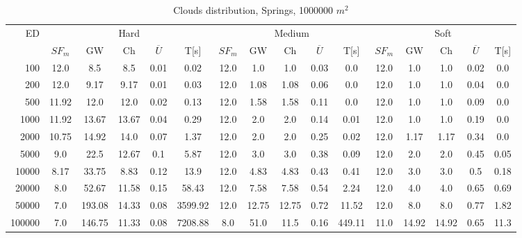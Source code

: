 \begin{table}[htb]
	\centering
	\footnotesize
	\begin{tabular}{|r|c|c|c|c|c|c|c|c|c|c|c|c|c|c|c|} 
		\hline
		\multirow{2}{*}{ED} & \multicolumn{5}{c|}{Hard} & \multicolumn{5}{c|}{Medium} &\multicolumn{5}{c|}{Soft} \\ 
		\cline{2-16} 
		&$SF_{m}$&GW & Ch & $\overline{U}$&T[s] &$SF_{m}$&GW & Ch & $\overline{U}$ &T[s] &$SF_{m}$&GW & Ch & $\overline{U}$  & T[s]  \\ 
		\hline 
		100 & 12.0 & 8.5 & 8.5 & 0.01 & 0.02 & 12.0 & 1.0 & 1.0 & 0.03 & 0.0 & 12.0 & 1.0 & 1.0 & 0.02 & 0.0\\ 
		200 & 12.0 & 9.17 & 9.17 & 0.01 & 0.03 & 12.0 & 1.08 & 1.08 & 0.06 & 0.0 & 12.0 & 1.0 & 1.0 & 0.04 & 0.0\\ 
		500 & 11.92 & 12.0 & 12.0 & 0.02 & 0.13 & 12.0 & 1.58 & 1.58 & 0.11 & 0.0 & 12.0 & 1.0 & 1.0 & 0.09 & 0.0\\ 
		1000 & 11.92 & 13.67 & 13.67 & 0.04 & 0.29 & 12.0 & 2.0 & 2.0 & 0.14 & 0.01 & 12.0 & 1.0 & 1.0 & 0.19 & 0.0\\ 
		2000 & 10.75 & 14.92 & 14.0 & 0.07 & 1.37 & 12.0 & 2.0 & 2.0 & 0.25 & 0.02 & 12.0 & 1.17 & 1.17 & 0.34 & 0.0\\ 
		5000 & 9.0 & 22.5 & 12.67 & 0.1 & 5.87 & 12.0 & 3.0 & 3.0 & 0.38 & 0.09 & 12.0 & 2.0 & 2.0 & 0.45 & 0.05\\ 
		10000 & 8.17 & 33.75 & 8.83 & 0.12 & 13.9 & 12.0 & 4.83 & 4.83 & 0.43 & 0.41 & 12.0 & 3.0 & 3.0 & 0.5 & 0.18\\ 
		20000 & 8.0 & 52.67 & 11.58 & 0.15 & 58.43 & 12.0 & 7.58 & 7.58 & 0.54 & 2.24 & 12.0 & 4.0 & 4.0 & 0.65 & 0.69\\ 
		50000 & 7.0 & 193.08 & 14.33 & 0.08 & 3599.92 & 12.0 & 12.75 & 12.75 & 0.72 & 11.52 & 12.0 & 8.0 & 8.0 & 0.77 & 1.82\\ 
		100000 & 7.0 & 146.75 & 11.33 & 0.08 & 7208.88 & 8.0 & 51.0 & 11.5 & 0.16 & 449.11 & 11.0 & 14.92 & 14.92 & 0.65 & 11.3\\ 
		\hline 
	\end{tabular} 
	\caption{Clouds distribution, Springs, 1000000 $m^2$} 
	\label{tab:UnSprings1000} 
\end{table} 
